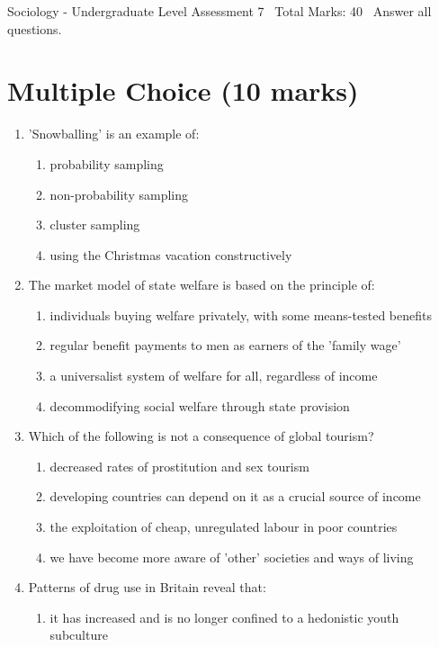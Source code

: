 \documentclass[12pt]{article}
\begin{document}
\begin{center}
Sociology - Undergraduate Level Assessment 7 \
Total Marks: 40 \
Answer all questions.
\end{center}

\section*{Multiple Choice (10 marks)}
\begin{enumerate}[label=\arabic*.]
\item 'Snowballing' is an example of:
\begin{enumerate}[label=(\alph*)]
    \item probability sampling
    \item non-probability sampling
    \item cluster sampling
    \item using the Christmas vacation constructively
\end{enumerate}
\item The market model of state welfare is based on the principle of:
\begin{enumerate}[label=(\alph*)]
    \item individuals buying welfare privately, with some means-tested benefits
    \item regular benefit payments to men as earners of the 'family wage'
    \item a universalist system of welfare for all, regardless of income
    \item decommodifying social welfare through state provision
\end{enumerate}
\item Which of the following is not a consequence of global tourism?
\begin{enumerate}[label=(\alph*)]
    \item decreased rates of prostitution and sex tourism
    \item developing countries can depend on it as a crucial source of income
    \item the exploitation of cheap, unregulated labour in poor countries
    \item we have become more aware of 'other' societies and ways of living
\end{enumerate}
\item Patterns of drug use in Britain reveal that:
\begin{enumerate}[label=(\alph*)]
    \item it has increased and is no longer confined to a hedonistic youth subculture

\end{enumerate}
\end{enumerate}
\end{document}
